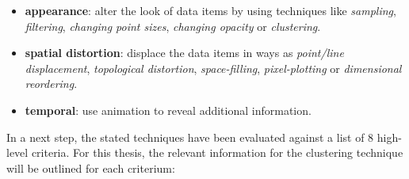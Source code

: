 \begin{itemize}

\item \textbf{appearance}: alter the look of data items by using techniques like \textit{sampling}, \textit{filtering}, \textit{changing point sizes}, \textit{changing opacity} or \textit{clustering}.

\item \textbf{spatial distortion}: displace the data items in ways as \textit{point/line displacement}, \textit{topological distortion}, \textit{space-filling}, \textit{pixel-plotting} or \textit{dimensional reordering}.

\item \textbf{temporal}: use animation to reveal additional information.

\end{itemize}

In a next step, the stated techniques have been evaluated against a list of 8 high-level criteria. For this thesis, the relevant information for the clustering technique will be outlined for each criterium:

